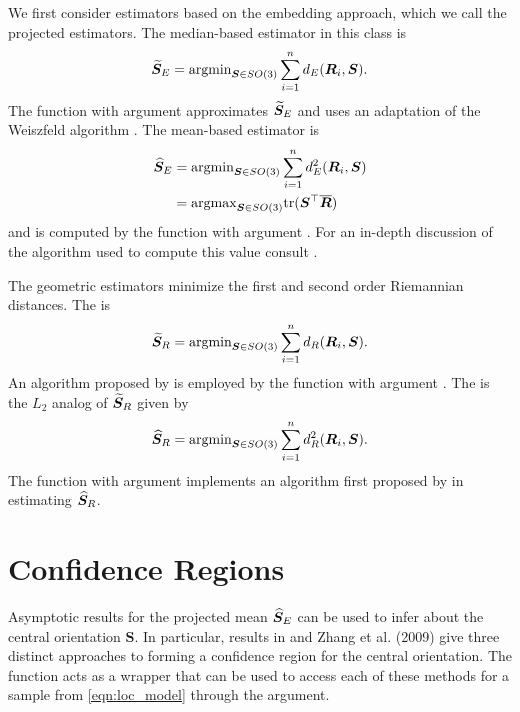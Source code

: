 We first consider estimators based on the embedding approach, which we call the projected estimators.  The median-based estimator in this class is
\begin{equation}\label{est:med}
\widetilde{\bm S}_E=\text{argmin}_{\bm{S}\in
SO(3)}\sum_{i=1}^nd_E(\bm{R}_i,\bm{S}).
\end{equation}
The function  with argument  approximates $\widetilde{\bm S}_E$ and uses an adaptation of the Weiszfeld algorithm \citep{weiszfeld1937}.  The mean-based estimator is 
\begin{align}\label{est:pam}
\widehat{\bm S}_E&=\text{argmin}_{\bm{S}\in
SO(3)}\sum_{i=1}^nd_E^2(\bm{R}_i,\bm{S})\nonumber\\
&=\text{argmax}_{\bm{S}\in
SO(3)}\text{tr}(\bm{S}^{\top}\overline{\bm{R}})
\end{align}
and is computed by the function  with argument .  For an in-depth discussion of the algorithm used to compute this value consult \citet{moakher2002}.

The geometric estimators minimize the first and second order Riemannian distances.  The  is 
\begin{equation}\label{est:lone}
\widetilde{\bm S}_R=\text{argmin}_{\bm{S}\in
SO(3)}\sum_{i=1}^nd_R(\bm{R}_i,\bm{S}).
\end{equation}
An algorithm proposed by \citet{hartley2011} is employed by the function  with argument .  The  is the $L_2$ analog of $\widetilde{\bm S}_R$ given by 
\begin{equation}\label{est:ltwo}
\widehat{\bm S}_R=\text{argmin}_{\bm{S}\in
SO(3)}\sum_{i=1}^nd_R^2(\bm{R}_i,\bm{S}).
\end{equation}
The function  with argument  implements an algorithm first proposed by \citet{manton2004} in estimating $\widehat{\bm S}_R$.

\section{Confidence Regions}

Asymptotic results for the projected mean $\widehat{\bm S}_E$ can be used to infer about the central orientation $\bm S$. In particular, results in \cite{prentice1986,chang2001} and Zhang et al. (2009) give three distinct approaches to forming a confidence region for the central orientation.  The  function acts as a wrapper that can be used to access each of these methods for a sample from \eqref{eqn:loc_model} through the  argument.


